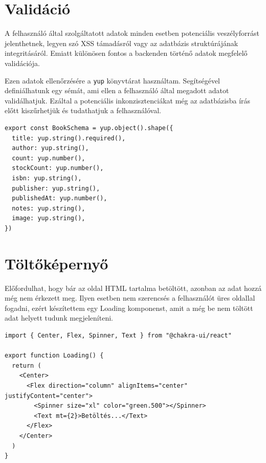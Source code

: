 \section{Validáció}

A felhasználó által szolgáltatott adatok minden esetben potenciális veszélyforrást jelenthetnek, legyen szó XSS támadásról
vagy az adatbázis struktúrájának integritásáról. Emiatt különösen fontos a backenden történő adatok megfelelő validációja.

Ezen adatok ellenőrzésére a \lstinline|yup| könyvtárat használtam. Segítségével definiálhatunk egy sémát, ami ellen
a felhasználó által megadott adatot validálhatjuk. Ezáltal a potenciális inkonzisztenciákat még az adatbázisba írás előtt
kiszűrhetjük és tudathatjuk a felhasználóval.

\begin{lstlisting}[caption=yup validációs séma a könyvekre]
export const BookSchema = yup.object().shape({
  title: yup.string().required(),
  author: yup.string(),
  count: yup.number(),
  stockCount: yup.number(),
  isbn: yup.string(),
  publisher: yup.string(),
  publishedAt: yup.number(),
  notes: yup.string(),
  image: yup.string(),
})
\end{lstlisting}


\section{Töltőképernyő}

Előfordulhat, hogy bár az oldal HTML tartalma betöltött, azonban az adat hozzá még nem érkezett meg.
Ilyen esetben nem szerencsés a felhasználót üres oldallal fogadni, ezért készítettem egy Loading komponenst, amit
a még be nem töltött adat helyett tudunk megjeleníteni.

\begin{lstlisting}[caption=Töltőképernyő komponens]
import { Center, Flex, Spinner, Text } from "@chakra-ui/react"

export function Loading() {
  return (
    <Center>
      <Flex direction="column" alignItems="center" justifyContent="center">
        <Spinner size="xl" color="green.500"></Spinner>
        <Text mt={2}>Betöltés...</Text>
      </Flex>
    </Center>
  )
}

\end{lstlisting}
